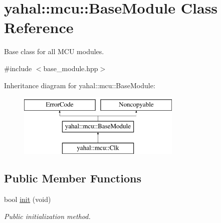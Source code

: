 \hypertarget{classyahal_1_1mcu_1_1_base_module}{}\section{yahal\+:\+:mcu\+:\+:Base\+Module Class Reference}
\label{classyahal_1_1mcu_1_1_base_module}


Base class for all M\+C\+U modules.  




{\ttfamily \#include $<$base\+\_\+module.\+hpp$>$}

Inheritance diagram for yahal\+:\+:mcu\+:\+:Base\+Module\+:\begin{figure}[H]
\begin{center}
\leavevmode
\includegraphics[height=3.000000cm]{classyahal_1_1mcu_1_1_base_module}
\end{center}
\end{figure}
\subsection*{Public Member Functions}
\begin{DoxyCompactItemize}
\item 
bool \hyperlink{classyahal_1_1mcu_1_1_base_module_ac2f9ef6ef85ac6cabe1f1f4837c15ef5}{init} (void)
\begin{DoxyCompactList}\small\item\em Public initialization method. \end{DoxyCompactList}\end{DoxyCompactItemize}

